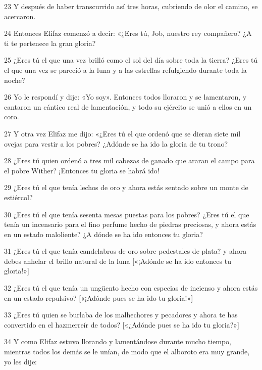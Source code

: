 \par 23 Y después de haber transcurrido así tres horas, cubriendo de olor el camino, se acercaron.

\par 24 Entonces Elifaz comenzó a decir: «¿Eres tú, Job, nuestro rey compañero? ¿A ti te pertenece la gran gloria?

\par 25 ¿Eres tú el que una vez brilló como el sol del día sobre toda la tierra? ¿Eres tú el que una vez se pareció a la luna y a las estrellas refulgiendo durante toda la noche?

\par 26 Yo le respondí y dije: «Yo soy». Entonces todos lloraron y se lamentaron, y cantaron un cántico real de lamentación, y todo su ejército se unió a ellos en un coro.

\par 27 Y otra vez Elifaz me dijo: «¿Eres tú el que ordenó que se dieran siete mil ovejas para vestir a los pobres? ¿Adónde se ha ido la gloria de tu trono?

\par 28 ¿Eres tú quien ordenó a tres mil cabezas de ganado que araran el campo para el pobre Wither? ¡Entonces tu gloria se habrá ido!

\par 29 ¿Eres tú el que tenía lechos de oro y ahora estás sentado sobre un monte de estiércol?

\par 30 ¿Eres tú el que tenía sesenta mesas puestas para los pobres? ¿Eres tú el que tenía un incensario para el fino perfume hecho de piedras preciosas, y ahora estás en un estado maloliente? ¿A dónde se ha ido entonces tu gloria?

\par 31 ¿Eres tú el que tenía candelabros de oro sobre pedestales de plata? y ahora debes anhelar el brillo natural de la luna [«¡Adónde se ha ido entonces tu gloria!»]

\par 32 ¿Eres tú el que tenía un ungüento hecho con especias de incienso y ahora estás en un estado repulsivo? [«¡Adónde pues se ha ido tu gloria!»]

\par 33 ¿Eres tú quien se burlaba de los malhechores y pecadores y ahora te has convertido en el hazmerreír de todos? [«¿Adónde pues se ha ido tu gloria?»]

\par 34 Y como Elifaz estuvo llorando y lamentándose durante mucho tiempo, mientras todos los demás se le unían, de modo que el alboroto era muy grande, yo les dije:

